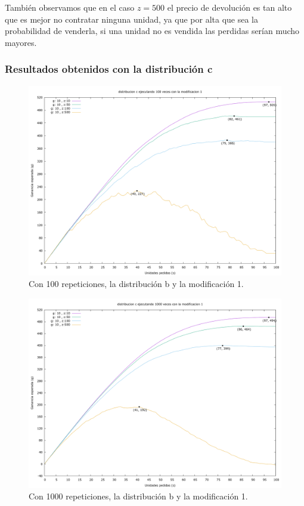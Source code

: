\documentclass[12pt, spanish]{article}
\begin{document}
También observamos que en el caso $z = 500$ el precio de devolución es tan alto que es mejor no contratar ninguna unidad, ya que por alta que sea la probabilidad de venderla, si una unidad no es vendida las perdidas serían mucho mayores.

\subsubsection{Resultados obtenidos con la distribución c}



\begin{figure}[H]
	\centering
	\includegraphics[scale = 0.2]{prob_c/datos_c_100_1.png}
	\caption{Con 100 repeticiones, la distribución b y la modificación 1.}
	\label{fig:ej1_a_100}

\end{figure}

\begin{figure}[H]
	\centering
	\includegraphics[scale = 0.2]{prob_c/datos_c_1000_1.png}
	\caption{Con 1000 repeticiones, la distribución b y la modificación 1.}
	\label{fig:ej1_a_1000}

\end{figure}
\end{document}
